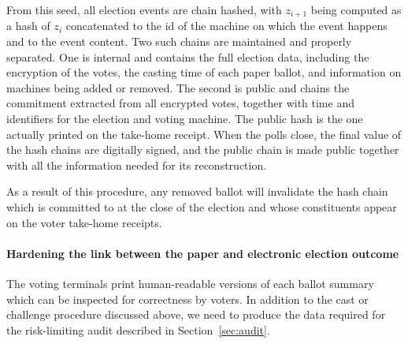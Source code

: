 
From this seed, all election events are chain hashed, with $z_{i+1}$
being computed as a hash of $z_i$ concatenated to the id of the
machine on which the event happens and to the event content. Two such
chains are maintained and properly separated. One is internal and
contains the full election data, including the encryption of the
votes, the casting time of each paper ballot, and information on
machines being added or removed.  The second is public and
chains the commitment extracted from all encrypted votes, together
with time and identifiers for the election and voting machine. The
public hash is the one actually printed on the take-home receipt. When
the polls close, the final value of the hash chains are digitally
signed, and the public chain is made public together with all the
information needed for its reconstruction. 

As a result of this procedure, any removed ballot will
invalidate the hash chain which is committed to at the close of the
election and whose constituents appear on the voter take-home receipts.

\paragraph{Hardening the link between the paper and electronic
  election outcome}
\label{sec:hard-link-betw}

\newcommand{\bid}{\ensuremath{{bid}}\xspace}
\newcommand{\bcid}{\ensuremath{{bcid}}\xspace}

The voting terminals print human-readable versions of each ballot
summary which can be inspected for correctness by voters.  In addition
to the cast or challenge procedure discussed above, we need to produce
the data required for the risk-limiting audit described in
Section~\ref{sec:audit}.

